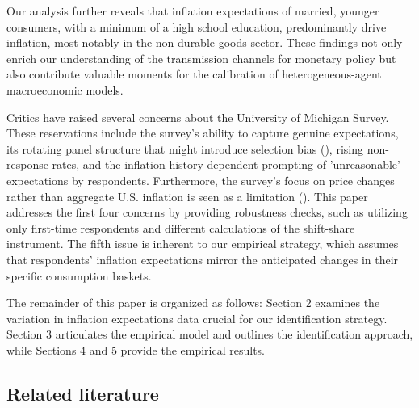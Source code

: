\documentclass[12pt]{article}
\begin{document}
Our analysis further reveals that inflation expectations of married, younger consumers, with a minimum of a high school education, predominantly drive inflation, most notably in the non-durable goods sector. These findings not only enrich our understanding of the transmission channels for monetary policy but also contribute valuable moments for the calibration of heterogeneous-agent macroeconomic models.

Critics have raised several concerns about the University of Michigan Survey. These reservations include the survey's ability to capture genuine expectations, its rotating panel structure that might introduce selection bias (\cite{BinderKim:AEJM2021}), rising non-response rates, and the inflation-history-dependent prompting of 'unreasonable' expectations by respondents. Furthermore, the survey's focus on price changes rather than aggregate U.S. inflation is seen as a limitation (\cite{JELexpects}). This paper addresses the first four concerns by providing robustness checks, such as utilizing only first-time respondents and different calculations of the shift-share instrument. The fifth issue is inherent to our empirical strategy, which assumes that respondents' inflation expectations mirror the anticipated changes in their specific consumption baskets.

The remainder of this paper is organized as follows: Section 2 examines the variation in inflation expectations data crucial for our identification strategy. Section 3 articulates the empirical model and outlines the identification approach, while Sections 4 and 5 provide the empirical results.

\subsection{Related literature}
\end{document}
